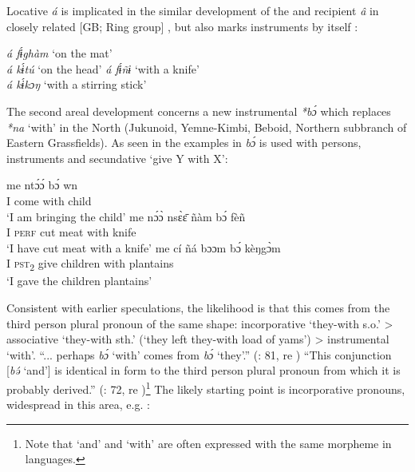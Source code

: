 \documentclass[output=paper]{langsci/langscibook}
\begin{document}
\noindent
Locative \textit{á} is implicated in the similar development of the  and recipient  \textit{â} in closely related  [GB; Ring group] \citep[152--8]{Watters1979}, but also marks instruments by itself \citep[45]{Hyman1979}:

\ea
\label{ex:hyman:22}
\ea 
\textit{á  f\'ɨghàm         }  ‘on the mat’\\
\textit{á  k\'ɨ{\downstep}tú}  ‘on the head’ 
\ex 
\textit{á  f\'ɨ{\downstep}ñɨ}  ‘with a knife’ \\ 
\textit{á  k\'ɨkɔŋ          }  ‘with a stirring stick’
\z 
\z 

  The second areal development concerns a new instrumental  \textit{*b\'ɔ} which replaces \textit{*na} ‘with’ in the North (Jukunoid, Yemne-Kimbi, Beboid, Northern subbranch of Eastern Grassfields). As seen in the  examples in  \textit{b\'ɔ} is used with persons, instruments and secundative ‘give Y with X’:

\ea
\label{ex:hyman:23}
\ea 
\gll me  nt\'ɔ\'ɔ  b\'ɔ  w{\textlowrisea}n\\
I   come with child \\ 
\glt ‘I am bringing the child’ 
\ex 
\gll me n\'ɔ\`ɔ  ns\`ɛ\=ɛ  ñàm  b\'ɔ  fèñ{\texthighriseo} \\ 
I   \textsc{perf}   cut   meat with knife\\
\glt ‘I have cut meat with a knife’ 
\ex 
\gll me cí  ñá    bɔɔm   b\'ɔ  kèŋg\`ɔm\\
I  \textsc{pst}\textsc{\textsubscript{2}} give children with plantains\\
\glt ‘I gave the children plantains’
\z 
\z 

\noindent
Consistent with earlier speculations, the likelihood is that this  comes from the third person plural pronoun of the same shape: incorporative ‘they-with s.o.’ {\textgreater} associative ‘they-with sth.’ (‘they left they-with load of yams’) {\textgreater} instrumental ‘with’.
“... perhaps \textit{b\'ɔ} ‘with’ comes from \textit{b\'ɔ} ‘they’.” (\citealt{Hyman1981}: 81, re )
 “This conjunction [\textit{b\'ə} ‘and’] is identical in form to the third person plural pronoun from which it is probably derived.” (\citealt{Hedinger2008}: 72, re )\footnote{ Note that ‘and’ and ‘with’ are often expressed with the same morpheme in  languages.}
The likely starting point is incorporative pronouns, widespread in this area, e.g.  \citep[73]{Hedinger2008}:
\end{document}
